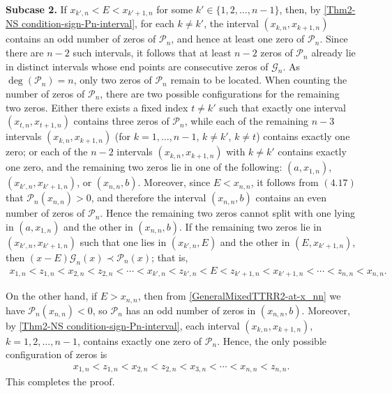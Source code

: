 \documentclass[final,3p,times,12pt]{elsarticle}
\numberwithin{equation}{section}  %
\begin{document}
\smallskip
\noindent
\textbf{Subcase 2.} If $x_{k',n} < E < x_{k'+1,n}$ for some $k' \in \{1, 2, \ldots, n-1\}$, then, by \eqref{Thm2-NS condition-sign-Pn-interval}, for each
$k\neq k'$, the interval $(x_{k,n},x_{k+1,n})$ contains an odd number of zeros of $\mathcal{P}_n$, and hence at least one zero of $\mathcal{P}_n$. Since there are $n-2$ such intervals, it follows that at least $n-2$ zeros of $\mathcal{P}_n$ already lie in distinct intervals whose end points are consecutive zeros of $\mathcal{G}_n$.
As $\deg(\mathcal{P}_n)=n$, only two zeros of $\mathcal{P}_n$ remain to be located. When counting the number of zeros of $\mathcal{P}_n$, there are two possible configurations for the remaining two zeros. Either there exists a fixed index $t \neq k'$ such that exactly one  interval $(x_{t,n}, x_{t+1,n})$ contains three zeros of $\mathcal{P}_n$, while each of the remaining $n-3$ intervals $(x_{k,n}, x_{k+1,n})$ (for $k = 1,\dots,n-1$, $k \neq k'$, $k \neq t$) contains exactly one zero; or each of the $n-2$ intervals $(x_{k,n}, x_{k+1,n})$ with $k \neq k'$ contains exactly one zero, and the remaining two zeros lie in one of the following: $(a, x_{1,n})$, $(x_{k',n}, x_{k'+1,n})$, or $(x_{n,n}, b)$. Moreover, since \(E<x_{n,n}\), it follows from \((4.17)\) that \(\mathcal{P}_n(x_{n,n})>0\), and therefore the interval \((x_{n,n},b)\) contains an even number of zeros of \(\mathcal{P}_n\).
Hence the remaining two zeros cannot split with one lying in \((a,x_{1,n})\) and the other in \((x_{n,n},b)\). If the remaining two zeros lie in $(x_{k',n}, x_{k'+1,n})$ such that one lies in $(x_{k',n}, E)$ and the other in $(E, x_{k'+1,n})$, then $(x-E)\mathcal{G}_n(x)\prec \mathcal{P}_n(x)$; that is,
\begin{align*}
	x_{1,n} < z_{1,n} < x_{2,n} < z_{2,n} < \cdots < x_{k',n} < z_{k',n} < E < z_{k'+1,n} < x_{k'+1,n} < \cdots < z_{n,n} < x_{n,n}.
\end{align*}

\smallskip
\noindent
On the other hand, if $E > x_{n,n}$, then from \eqref{GeneralMixedTTRR2-at-x_nn} we have $\mathcal{P}_n(x_{n,n}) < 0$, so $\mathcal{P}_n$ has an odd number of zeros in $(x_{n,n}, b)$. Moreover, by \eqref{Thm2-NS condition-sign-Pn-interval}, each interval $(x_{k,n}, x_{k+1,n})$, $k = 1, 2, \ldots, n-1$, contains exactly one zero of $\mathcal{P}_n$. Hence, the only possible configuration of zeros is
\begin{align}
	x_{1,n} < z_{1,n} < x_{2,n} < z_{2,n} < x_{3,n} < \cdots < x_{n,n} < z_{n,n}.
\end{align}
This completes the proof.
\end{document}
